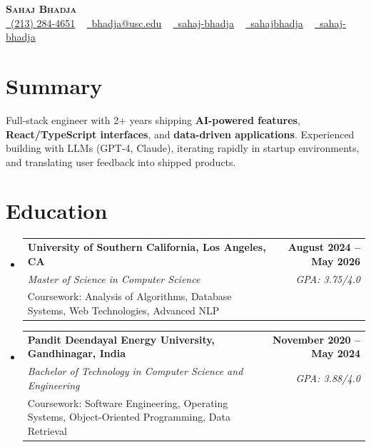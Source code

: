 \documentclass[letterpaper,10pt]{article}
\makeatletter
\newcommand{\resumeEduSubheading}[5]{\vspace{-1pt}\item\begin{tabular*}{1.0\textwidth}[t]{l@{\extracolsep{\fill}}r}\textbf{#1} & \textbf{\small #2} \\\textit{\small #3} & \textit{\small #4} \\\small #5 & \\\end{tabular*}\vspace{-4pt}}
\newcommand{\resumeSubHeadingListStart}{\begin{itemize}[leftmargin=0.0in, label={}]}
\newcommand{\resumeSubHeadingListEnd}{\end{itemize}}
\makeatother
\begin{document}
\begin{center}
{\Huge \scshape \textbf{Sahaj Bhadja}} \\ \vspace{1pt}
\small \href{tel:(213) 284-4651}{\faPhone\ \underline{(213) 284-4651}} ~ \href{mailto:bhadja@usc.edu}{\raisebox{-0.2\height}\faEnvelope\ \underline{bhadja@usc.edu}} ~
\href{https://www.linkedin.com/in/sahaj-bhadja/}{\raisebox{-0.2\height}\faLinkedin\ \underline{sahaj-bhadja}} ~ \href{https://github.com/SAHAJ-BHADJA}{\raisebox{-0.2\height}\faGithub\ \underline{sahajbhadja}} ~
\href{https://sahaj-bhadja.vercel.app/}{\raisebox{-0.2\height}\faGlobe\ \underline{sahaj-bhadja}}
\end{center}
\vspace{-18pt}
\section{Summary}
\begin{itemize}[leftmargin=0.15in, label={}]
\small{\item{Full-stack engineer with 2+ years shipping \textbf{AI-powered features}, \textbf{React/TypeScript interfaces}, and \textbf{data-driven applications}. Experienced building with LLMs (GPT-4, Claude), iterating rapidly in startup environments, and translating user feedback into shipped products.}}
\end{itemize}
\vspace{-16pt}
\section{Education}
\resumeSubHeadingListStart
\resumeEduSubheading{University of Southern California, Los Angeles, CA}{August 2024 -- May 2026}{Master of Science in Computer Science}{GPA: 3.75/4.0}{Coursework: Analysis of Algorithms, Database Systems, Web Technologies, Advanced NLP}
\vspace{-9pt}
\resumeEduSubheading{Pandit Deendayal Energy University, Gandhinagar, India}{November 2020 -- May 2024}{Bachelor of Technology in Computer Science and Engineering}{GPA: 3.88/4.0}{Coursework: Software Engineering, Operating Systems, Object-Oriented Programming, Data Retrieval}
\resumeSubHeadingListEnd
\vspace{-14pt}
\end{document}
